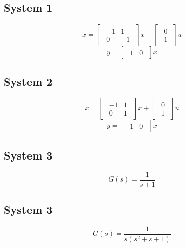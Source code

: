 \documentclass{sprawozdanie-agh}
\begin{document}
    \subsection{System 1}
    $$
        \dot{x}
        =
        \begin{bmatrix}
        \begin{array}{rr}
            -1 & 1\\
            0 & -1
        \end{array}                
        \end{bmatrix}
        x
        +
        \begin{bmatrix}
        \begin{array}{c}
            0\\
            1
        \end{array}                
        \end{bmatrix}
        u
    $$
    $$
        y
        =
        \begin{bmatrix}
        \begin{array}{cc}
            1 & 0
        \end{array}                
        \end{bmatrix}
        x
    $$

    \subsection{System 2}
    $$
        \dot{x}
        =
        \begin{bmatrix}
        \begin{array}{rr}
            -1 & 1\\
            0 & 1
        \end{array}                
        \end{bmatrix}
        x
        +
        \begin{bmatrix}
        \begin{array}{c}
            0\\
            1
        \end{array}                
        \end{bmatrix}
        u
    $$
    $$
        y
        =
        \begin{bmatrix}
        \begin{array}{cc}
            1 & 0
        \end{array}                
        \end{bmatrix}
        x
    $$

    \subsection{System 3}
    $$
        G(s) = \frac{1}{s+1}
    $$

    \subsection{System 3}
    $$
        G(s) = \frac{1}{s(s^2+s+1)}
    $$
   
\end{document}

